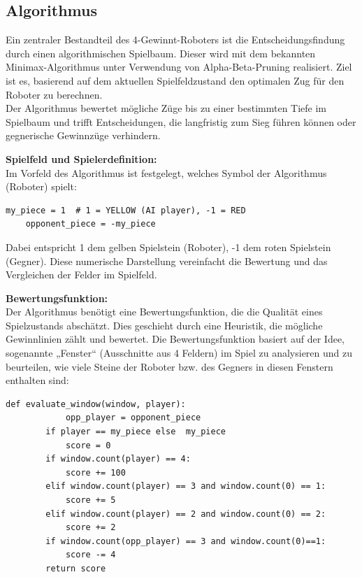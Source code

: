\subsection{Algorithmus}

Ein zentraler Bestandteil des 4-Gewinnt-Roboters ist die Entscheidungsfindung durch einen algorithmischen Spielbaum. Dieser wird mit dem bekannten Minimax-Algorithmus unter Verwendung von Alpha-Beta-Pruning realisiert. Ziel ist es, basierend auf dem aktuellen Spielfeldzustand den optimalen Zug für den Roboter zu berechnen.\\
Der Algorithmus bewertet mögliche Züge bis zu einer bestimmten Tiefe im Spielbaum und trifft Entscheidungen, die langfristig zum Sieg führen können oder gegnerische Gewinnzüge verhindern.

\textbf{Spielfeld und Spielerdefinition:}\\
Im Vorfeld des Algorithmus ist festgelegt, welches Symbol der Algorithmus (Roboter) spielt:

\begin{lstlisting}[style=pythonstyle]
	my_piece = 1  # 1 = YELLOW (AI player), -1 = RED
	opponent_piece = -my_piece
\end{lstlisting}

Dabei entspricht 1 dem gelben Spielstein (Roboter), -1 dem roten Spielstein (Gegner). Diese numerische Darstellung vereinfacht die Bewertung und das Vergleichen der Felder im Spielfeld.

\textbf{Bewertungsfunktion:}\\
Der Algorithmus benötigt eine Bewertungsfunktion, die die Qualität eines Spielzustands abschätzt. Dies geschieht durch eine Heuristik, die mögliche Gewinnlinien zählt und bewertet.
Die Bewertungsfunktion basiert auf der Idee, sogenannte „Fenster“ (Ausschnitte aus 4 Feldern) im Spiel zu analysieren und zu beurteilen, wie viele Steine der Roboter bzw. des Gegners in diesen Fenstern enthalten sind: \newpage

\begin{lstlisting}[style=pythonstyle]
	def evaluate_window(window, player):
			opp_player = opponent_piece 
		if player == my_piece else 	my_piece
			score = 0
		if window.count(player) == 4:
			score += 100
		elif window.count(player) == 3 and window.count(0) == 1:
			score += 5
		elif window.count(player) == 2 and window.count(0) == 2:
			score += 2
		if window.count(opp_player) == 3 and window.count(0)==1:
			score -= 4
		return score
\end{lstlisting}

